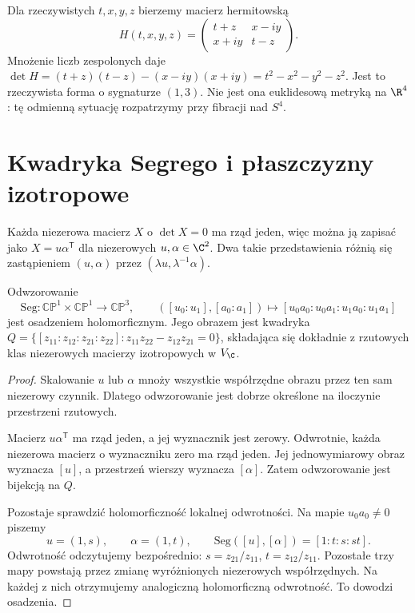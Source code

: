 \begin{przyklad}
\label{prz:lin32-hermit}
Dla rzeczywistych $t,x,y,z$ bierzemy macierz hermitowską
\[
 H(t,x,y,z)=
 \begin{pmatrix}t+z&x-iy\\x+iy&t-z\end{pmatrix}.
\]
Mnożenie liczb zespolonych daje
$\det H=(t+z)(t-z)-(x-iy)(x+iy)=t^2-x^2-y^2-z^2$.
Jest to rzeczywista forma o sygnaturze $(1,3)$.
Nie jest ona euklidesową metryką na $\R^4$:
tę odmienną sytuację rozpatrzymy przy fibracji nad $S^4$.
\end{przyklad}

\section{Kwadryka Segrego i płaszczyzny izotropowe}
\label{sec:lin32-segre}
Każda niezerowa macierz $X$ o $\det X=0$ ma rząd
jeden, więc można ją zapisać jako
$X=u\alpha^{\mathsf T}$ dla niezerowych
$u,\alpha\in\C^2$. Dwa takie przedstawienia
różnią się zastąpieniem $(u,\alpha)$ przez
$(\lambda u,\lambda^{-1}\alpha)$.

\begin{twierdzenie}
\label{thm:lin32-segre}
Odwzorowanie
\[
 \mathrm{Seg}:\mathbb{CP}^1\times\mathbb{CP}^1
 \longrightarrow\mathbb{CP}^3,\qquad
 ([u_0:u_1],[a_0:a_1])
 \longmapsto[u_0a_0:u_0a_1:u_1a_0:u_1a_1]
\]
jest osadzeniem holomorficznym. Jego obrazem jest
kwadryka $Q=\{[z_{11}:z_{12}:z_{21}:z_{22}]:
z_{11}z_{22}-z_{12}z_{21}=0\}$, składająca się
dokładnie z rzutowych klas niezerowych macierzy
izotropowych w $V_{\C}$.
\end{twierdzenie}
\begin{proof}
Skalowanie $u$ lub $\alpha$ mnoży wszystkie
współrzędne obrazu przez ten sam niezerowy czynnik.
Dlatego odwzorowanie jest dobrze określone
na iloczynie przestrzeni rzutowych.

Macierz $u\alpha^{\mathsf T}$ ma rząd jeden,
a jej wyznacznik jest zerowy. Odwrotnie,
każda niezerowa macierz o wyznaczniku zero
ma rząd jeden. Jej jednowymiarowy obraz
wyznacza $[u]$, a przestrzeń wierszy
wyznacza $[\alpha]$. Zatem odwzorowanie
jest bijekcją na $Q$.

Pozostaje sprawdzić holomorficzność lokalnej odwrotności.
Na mapie $u_0a_0\ne0$ piszemy
\[
 u=(1,s),\qquad \alpha=(1,t),\qquad
 \mathrm{Seg}([u],[\alpha])=[1:t:s:st].
\]
Odwrotność odczytujemy bezpośrednio:
$s=z_{21}/z_{11}$, $t=z_{12}/z_{11}$.
Pozostałe trzy mapy powstają przez zmianę
wyróżnionych niezerowych współrzędnych.
Na każdej z nich otrzymujemy analogiczną
holomorficzną odwrotność. To dowodzi osadzenia.
\end{proof}

